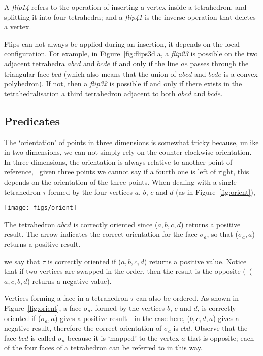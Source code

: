 A \emph{flip14} refers to the operation of inserting a vertex inside a tetrahedron, and splitting it into four tetrahedra; and a \emph{flip41} is the inverse operation that deletes a vertex.

Flips can not always be applied during an insertion, it depends on the local configuration.
For example, in Figure~\ref{fig:flips3d}a, a \emph{flip23} is possible on the two adjacent tetrahedra $abcd$ and $bcde$ if and only if the line $ae$ passes through the triangular face $bcd$ (which also means that the union of $abcd$ and $bcde$ is a convex polyhedron). 
If not, then a \emph{flip32} is possible if and only if there exists in the tetrahedralisation a third tetrahedron adjacent to both $abcd$ and $bcde$.



\subsection{Predicates}

The `orientation' of points in three dimensions is somewhat tricky because, unlike in two dimensions, we can not simply rely on the counter-clockwise orientation. 
In three dimensions, the orientation is always relative to another point of reference, \ie\ given three points we cannot say if a fourth one is left of right, this depends on the orientation of the three points.
When dealing with a single tetrahedron $\tau$ formed by the four vertices $a$, $b$, $c$ and $d$ (as in Figure~\ref{fig:orient}), 
\begin{marginfigure}
  \centering
  \texttt{[image: figs/orient]}
  \caption[Orientation of a tetrahedron]{The tetrahedron $abcd$ is correctly oriented since \Orient($a,b,c,d$) returns a positive result. The arrow indicates the correct orientation for the face $\sigma_a$, so that \Orient($\sigma_a,a$) returns a positive result.}%
\label{fig:orient}
\end{marginfigure}
we say that $\tau$ is correctly oriented if \Orient($a,b,c,d$) returns a positive value. 
Notice that if two vertices are swapped in the order, then the result is the opposite (\ie\ \Orient($a,c,b,d$) returns a negative value). 

Vertices forming a face in a tetrahedron $\tau$ can also be ordered. 
As shown in Figure~\ref{fig:orient}, a face $\sigma_a$, formed by the vertices $b$, $c$ and $d$, is correctly oriented if \Orient($\sigma_a,a$) gives a positive result---in the case here, \Orient($b,c,d,a$) gives a negative result, therefore the correct orientation of $\sigma_a$ is $cbd$. Observe that the face $bcd$ is called $\sigma_a$ because it is `mapped' to the vertex $a$ that is opposite; each of the four faces of a tetrahedron can be referred to in this way.

